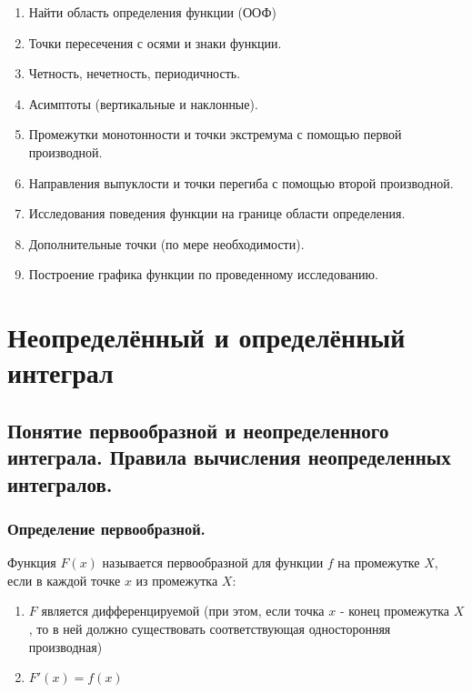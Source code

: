 \documentclass[a4paper,12pt]{article}
\theoremstyle{plain} %
\theoremstyle{definition} %
\theoremstyle{remark} %
\begin{document}
\begin{enumerate}
	\item Найти область определения функции (ООФ)
	\item Точки пересечения с осями и знаки функции.
	\item Четность, нечетность, периодичность.
	\item Асимптоты (вертикальные и наклонные).
	\item Промежутки монотонности и точки экстремума с помощью первой производной.
	\item Направления выпуклости и точки перегиба с помощью второй производной.
	\item Исследования поведения функции на границе области определения.
	\item Дополнительные точки (по мере необходимости).
	\item Построение графика функции по проведенному исследованию.
\end{enumerate}



\newpage
\section*{Неопределённый и определённый интеграл}

\subsection*{Понятие первообразной и неопределенного интеграла. Правила вычисления неопределенных интегралов.}

\subsubsection*{Определение первообразной.}
Функция $F(x)$ называется первообразной для функции $f$ на промежутке $X$, если в каждой точке $x$ из промежутка $X$:
\begin{enumerate}
	\item $F$ является дифференцируемой (при этом, если точка $x$ - конец промежутка $X$, то в ней должно существовать соответствующая односторонняя производная)
	\item $F'(x) = f(x)$
\end{enumerate}
\end{document}
